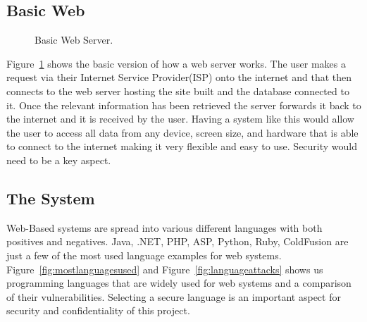 \documentclass[../main.tex]{subfiles}
\begin{document}
\raggedright

\subsection{Basic Web}

	\begin{figure}[H]
        \caption{\label{fig:basicwebdesign} Basic Web Server.}
      \end{figure}
      
Figure~\ref{fig:basicwebdesign} shows the basic version of how a web server works. The user makes a request via their Internet Service Provider(ISP) onto the internet and that then connects to the web server hosting the site built and the database connected to it. Once the relevant information has been retrieved the server forwards it back to the internet and it is received by the user. Having a system like this would allow the user to access all data from any device, screen size, and hardware that is able to connect to the internet making it very flexible and easy to use. Security would need to be a key aspect. 
      
\subsection{The System}
      
Web-Based systems are spread into various different languages with both positives and negatives. Java, .NET, PHP, ASP, Python, Ruby, ColdFusion are just a few of the most used language examples for web systems\cite{securelanguage}. Figure~\ref{fig:mostlanguagesused} and Figure~\ref{fig:languageattacks} shows us programming languages that are widely used for web systems and a comparison of their vulnerabilities. Selecting a secure language is an important aspect for security and confidentiality of this project.  \\[2mm]
\end{document}
